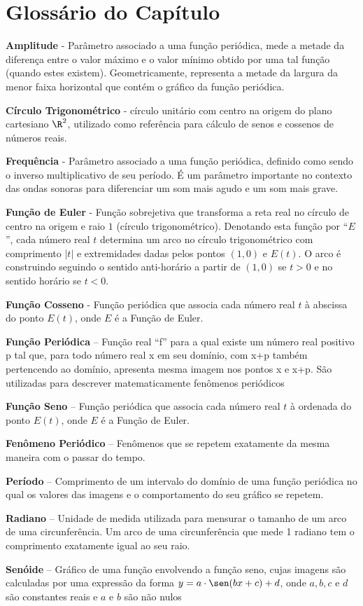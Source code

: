 \clearpage

\section{Glossário do Capítulo}

\textbf{Amplitude} - Parâmetro associado a uma função periódica, mede a metade da diferença entre o valor máximo e o valor mínimo obtido por uma tal função (quando estes existem). Geometricamente, representa a metade da largura da menor faixa horizontal que contém o gráfico da função periódica.

\textbf{Círculo Trigonométrico} - círculo unitário com centro na origem do plano cartesiano $\R^2$, utilizado como referência para cálculo de senos e cossenos de números reais.

\textbf{Frequência} - Parâmetro associado a uma função periódica, definido como sendo o inverso multiplicativo de seu período. É um parâmetro importante no contexto das ondas sonoras para diferenciar um som mais agudo e um som mais grave. 

\textbf{Função de Euler} - Função sobrejetiva que transforma a reta real no círculo de centro na origem e raio $1$ (círculo trigonométrico). Denotando esta função por “$E$”, cada número real $t$ determina um arco no círculo trigonométrico com comprimento $|t|$ e extremidades dadas pelos pontos $(1,0)$ e $E(t)$. O arco é construindo seguindo o sentido anti-horário a partir de $(1,0)$ se $t > 0$ e no sentido horário se $t < 0$. 

\textbf{Função Cosseno}  - Função periódica que associa cada número real $t$ à abscissa do ponto $E(t)$, onde $E$ é a Função de Euler.

\textbf{Função Periódica} – Função real “f” para a qual existe um número real positivo p tal que,
para todo número real x em seu domínio, com x+p também pertencendo ao domínio,
apresenta mesma imagem nos pontos x e x+p. São utilizadas para descrever
matematicamente fenômenos periódicos

\textbf{Função Seno} – Função periódica que associa cada número real $t$ à ordenada do ponto $E(t)$, onde $E$ é a Função de Euler.

\textbf{Fenômeno Periódico} – Fenômenos que se repetem exatamente da mesma maneira com o passar do tempo.

\textbf{Período} – Comprimento de um intervalo do domínio de uma função periódica no qual os valores das imagens e o comportamento do seu gráfico se repetem.

\textbf{Radiano} – Unidade de medida utilizada para mensurar o tamanho de um arco de uma circunferência. Um arco de uma circunferência que mede 1 radiano tem o comprimento exatamente igual ao seu raio.

\textbf{Senóide} – Gráfico de uma função envolvendo a função seno, cujas imagens são calculadas por uma expressão da forma $y=a\cdot\sen(bx+c)+d$, onde $a,b,c$ e $d$ são constantes reais e $a$ e $b$ são não nulos

\ifnum{}
\clearpage
\else
\notasfinais
\fi




\nocite{*}


